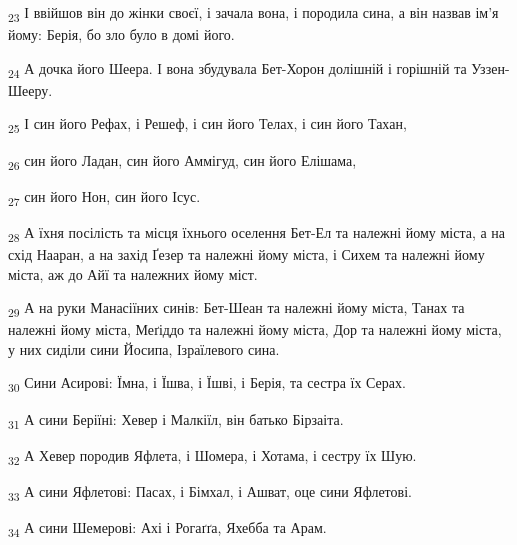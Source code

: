 \begin{tcolorbox}
\textsubscript{23} І ввійшов він до жінки своєї, і зачала вона, і породила сина, а він назвав ім'я йому: Берія, бо зло було в домі його.
\end{tcolorbox}
\begin{tcolorbox}
\textsubscript{24} А дочка його Шеера. І вона збудувала Бет-Хорон долішній і горішній та Уззен-Шееру.
\end{tcolorbox}
\begin{tcolorbox}
\textsubscript{25} І син його Рефах, і Решеф, і син його Телах, і син його Тахан,
\end{tcolorbox}
\begin{tcolorbox}
\textsubscript{26} син його Ладан, син його Аммігуд, син його Елішама,
\end{tcolorbox}
\begin{tcolorbox}
\textsubscript{27} син його Нон, син його Ісус.
\end{tcolorbox}
\begin{tcolorbox}
\textsubscript{28} А їхня посілість та місця їхнього оселення Бет-Ел та належні йому міста, а на схід Нааран, а на захід Ґезер та належні йому міста, і Сихем та належні йому міста, аж до Айї та належних йому міст.
\end{tcolorbox}
\begin{tcolorbox}
\textsubscript{29} А на руки Манасіїних синів: Бет-Шеан та належні йому міста, Танах та належні йому міста, Меґіддо та належні йому міста, Дор та належні йому міста, у них сиділи сини Йосипа, Ізраїлевого сина.
\end{tcolorbox}
\begin{tcolorbox}
\textsubscript{30} Сини Асирові: Їмна, і Їшва, і Їшві, і Берія, та сестра їх Серах.
\end{tcolorbox}
\begin{tcolorbox}
\textsubscript{31} А сини Беріїні: Хевер і Малкіїл, він батько Бірзаіта.
\end{tcolorbox}
\begin{tcolorbox}
\textsubscript{32} А Хевер породив Яфлета, і Шомера, і Хотама, і сестру їх Шую.
\end{tcolorbox}
\begin{tcolorbox}
\textsubscript{33} А сини Яфлетові: Пасах, і Бімхал, і Ашват, оце сини Яфлетові.
\end{tcolorbox}
\begin{tcolorbox}
\textsubscript{34} А сини Шемерові: Ахі і Рогаґґа, Яхебба та Арам.
\end{tcolorbox}
